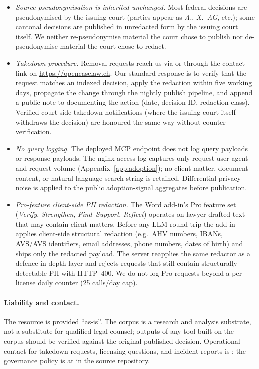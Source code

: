 \begin{itemize}
\item \emph{Source pseudonymisation is inherited unchanged.} Most
federal decisions are pseudonymised by the issuing court (parties
appear as \emph{A.}, \emph{X.\ AG}, etc.); some cantonal decisions
are published in unredacted form by the issuing court itself. We
neither re-pseudonymise material the court chose to publish nor
de-pseudonymise material the court chose to redact.

\item \emph{Takedown procedure.} Removal requests reach us via
 or through the contact link on
\url{https://opencaselaw.ch}. Our standard response is to verify that
the request matches an indexed decision, apply the redaction within
five working days, propagate the change through the nightly publish
pipeline, and append a public note to 
documenting the action (date, decision ID, redaction class).
Verified court-side takedown notifications (where the issuing court
itself withdraws the decision) are honoured the same way without
counter-verification.

\item \emph{No query logging.} The deployed MCP endpoint does not
log query payloads or response payloads. The nginx access log
captures only request user-agent and request volume (Appendix~\ref{app:adoption});
no client matter, document content, or natural-language search
string is retained. Differential-privacy noise is applied to the
public adoption-signal aggregates before publication.

\item \emph{Pro-feature client-side PII redaction.} The Word add-in's
Pro feature set (\emph{Verify}, \emph{Strengthen}, \emph{Find~Support},
\emph{Reflect}) operates on lawyer-drafted text that may contain
client matters. Before any LLM round-trip the add-in applies
client-side structural redaction (e.g.\ AHV numbers, IBANs, AVS/AVS
identifiers, email addresses, phone numbers, dates of birth) and
ships only the redacted payload. The server reapplies the same
redactor as a defence-in-depth layer and rejects requests that still
contain structurally-detectable PII with HTTP~400. We do not log Pro
requests beyond a per-license daily counter (25 calls/day cap).
\end{itemize}

\paragraph{Liability and contact.} The resource is provided
``as-is''. The corpus is a research and analysis substrate, not a
substitute for qualified legal counsel; outputs of any tool built on
the corpus should be verified against the original published
decision. Operational contact for takedown requests, licensing
questions, and incident reports is ; the
governance policy is at
 in the source
repository.

